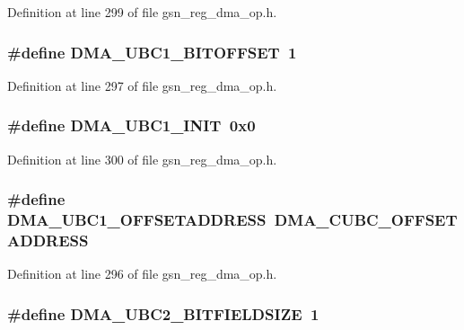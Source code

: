 Definition at line 299 of file gsn\_\-reg\_\-dma\_\-op.h.

\hypertarget{a00547_acdb464b248cc252121d84a3ce18d8669}{
\subsubsection[{DMA\_\-UBC1\_\-BITOFFSET}]{\setlength{\rightskip}{0pt plus 5cm}\#define DMA\_\-UBC1\_\-BITOFFSET~1}}
\label{a00547_acdb464b248cc252121d84a3ce18d8669}


Definition at line 297 of file gsn\_\-reg\_\-dma\_\-op.h.

\hypertarget{a00547_a7dc34a4ca9ded0568d6e4d792f892144}{
\subsubsection[{DMA\_\-UBC1\_\-INIT}]{\setlength{\rightskip}{0pt plus 5cm}\#define DMA\_\-UBC1\_\-INIT~0x0}}
\label{a00547_a7dc34a4ca9ded0568d6e4d792f892144}


Definition at line 300 of file gsn\_\-reg\_\-dma\_\-op.h.

\hypertarget{a00547_a0b26abcc7063d07a8d444322a7298b77}{
\subsubsection[{DMA\_\-UBC1\_\-OFFSETADDRESS}]{\setlength{\rightskip}{0pt plus 5cm}\#define DMA\_\-UBC1\_\-OFFSETADDRESS~DMA\_\-CUBC\_\-OFFSETADDRESS}}
\label{a00547_a0b26abcc7063d07a8d444322a7298b77}


Definition at line 296 of file gsn\_\-reg\_\-dma\_\-op.h.

\hypertarget{a00547_a9c414d2c2138cc764fadd4cc108193b2}{
\subsubsection[{DMA\_\-UBC2\_\-BITFIELDSIZE}]{\setlength{\rightskip}{0pt plus 5cm}\#define DMA\_\-UBC2\_\-BITFIELDSIZE~1}}
\label{a00547_a9c414d2c2138cc764fadd4cc108193b2}


